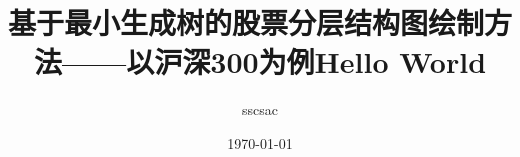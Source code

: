 \documentclass{report}
\title{基于最小生成树的股票分层结构图绘制方法——以沪深300为例}
\title{Hello World}
\author{sscsac}
\date{\today}
\begin{document}
\begin{CJK}{UTF8}{gbsn}

\newpage

\maketitle

\newpage

\renewcommand{\contentsname}{目录}
\tableofcontents








\nocite{*} 




\end{CJK}
\end{document}
